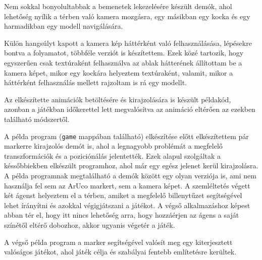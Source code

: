 Nem sokkal bonyolultabbak a bemenetek lekezelésére készült demók, ahol lehetőség nyílik a térben való kamera mozgásra, egy másikban egy kocka és egy harmadikban egy modell navigálására.

Külön hangsúlyt kapott a kamera kép háttérként való felhasználásása, lépésekre bontva a folyamatot, többféle verziót is készítettem. Ezek közé tartozik, hogy egyszerűen csak textúraként felhasználva az ablak hátterének állítottam be a kamera képet, mikor egy kockára helyeztem textúraként, valamit, mikor a háttérként felhasználás mellett rajzoltam is rá egy modellt.

Az elkészítette animációk betöltésére és kirajzolására is készült példakód, azonban a játékban időkerettel lett megvalósítva az animáció eltérően az ezekben található módszertől.

A példa program (\texttt{game} mappában található) elkészítése előtt elkészítettem pár markerre kirajzolós demót is, ahol a legnagyobb problémát a megfelelő transzformációk és
a poziciónálás jelentették. Ezek alapul szolgáltak a késsőbbiekben elkészült programhoz, ahol már egy egész jelenet kerül kirajzolásra.
A példa programnak megtalálható a demók között egy olyan verziója is, ami nem használja fel sem az ArUco markert, sem a kamera képet. 
A szemléltetés végett két ágenst helyeztem el a térben, amiket a megfelelő billenytűzet segítségével lehet írányítni és azokkal végigjátszani a játékot.
A végső alkalmazáshoz képest abban tér el, hogy itt nincs lehetőség arra, hogy hozzáérjen az ágens a saját színétől eltérő dobozhoz, akkor ugyanis végetér a játék.

A végső példa program a marker segítségével valósít meg egy kiterjesztett valóságos játékot, ahol játék célja és szabályai fentebb említetésre kerültek. 



